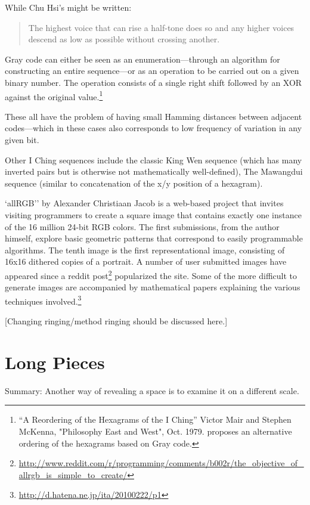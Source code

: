 \documentclass{thesis}
\begin{document}
	While Chu Hsi's might be written:
	
	\begin{quote}
	The highest voice that can rise a half-tone does so and any higher voices descend as low as possible without crossing another.
	\end{quote}
	
	Gray code can either be seen as an enumeration---through an algorithm for constructing an entire sequence---or as an operation to be carried out on a given binary number. The operation consists of a single right shift followed by an XOR against the original value.\footnote{``A Reordering of the Hexagrams of the I Ching'' Victor Mair and Stephen McKenna, "Philosophy East and West", Oct. 1979. proposes an alternative ordering of the hexagrams based on Gray code.}
	
	These all have the problem of having small Hamming distances between adjacent codes---which in these cases also corresponds to low frequency of variation in any given bit.
	
	Other I Ching sequences include the classic King Wen sequence (which has many inverted pairs but is otherwise not mathematically well-defined), The Mawangdui sequence (similar to concatenation of the x/y position of a hexagram).
	
	`allRGB'' by Alexander Christiaan Jacob\cite{alexander_christiaan_jacob_allrgb_2008} is a web-based project that invites visiting programmers to create a square image that contains exactly one instance of the 16 million 24-bit RGB colors. The first submissions, from the author himself, explore basic geometric patterns that correspond to easily programmable algorithms. The tenth image is the first representational image, consisting of 16x16 dithered copies of a portrait. A number of user submitted images have appeared since a reddit post\footnote{\url{http://www.reddit.com/r/programming/comments/b002r/the\_objective\_of\_allrgb\_is\_simple\_to\_create/}} popularized the site. Some of the more difficult to generate images are accompanied by mathematical papers explaining the various techniques involved.\footnote{\url{http://d.hatena.ne.jp/ita/20100222/p1}}
		
	[Changing ringing/method ringing should be discussed here.]
		
\section{Long Pieces}

	Summary: Another way of revealing a space is to examine it on a different scale.
\end{document}
